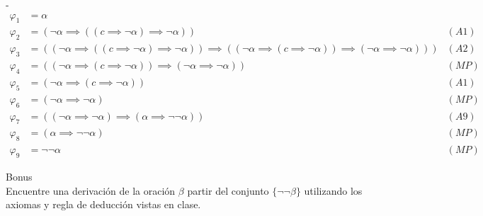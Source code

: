 \begin{sol}
    -\begin{align*}
        \varphi_1 & = \alpha                                                                                                                                                                             \\
        \varphi_2 & = (\neg \alpha \implies ((c \implies \neg \alpha )\implies \neg \alpha))                                                                                                      & (A1) \\
        \varphi_3 & = ((\neg \alpha \implies ((c \implies \neg \alpha)\implies \neg \alpha))\implies ((\neg \alpha \implies (c \implies \neg \alpha))\implies(\neg \alpha \implies \neg \alpha))) & (A2) \\
        \varphi_4 & = ((\neg \alpha \implies (c \implies \neg \alpha))\implies (\neg \alpha \implies \neg \alpha))                                                                                & (MP) \\
        \varphi_5 & = (\neg \alpha \implies (c \implies \neg \alpha))                                                                                                                             & (A1) \\
        \varphi_6 & = (\neg \alpha \implies \neg \alpha)                                                                                                                                          & (MP) \\
        \varphi_7 & = ((\neg \alpha \implies \neg \alpha) \implies (\alpha \implies \neg \neg \alpha))                                                                                            & (A9) \\
        \varphi_8 & = (\alpha \implies \neg \neg \alpha)                                                                                                                                          & (MP) \\
        \varphi_9 & = \neg \neg \alpha                                                                                                                                                            & (MP)
    \end{align*}
\end{sol}

\begin{prob}
    Bonus
    \\
    Encuentre una derivación de la oración $\beta$  partir del conjunto $\{\neg \neg \beta\}$ utilizando los axiomas y regla de deducción vistas en clase.
\end{prob}

